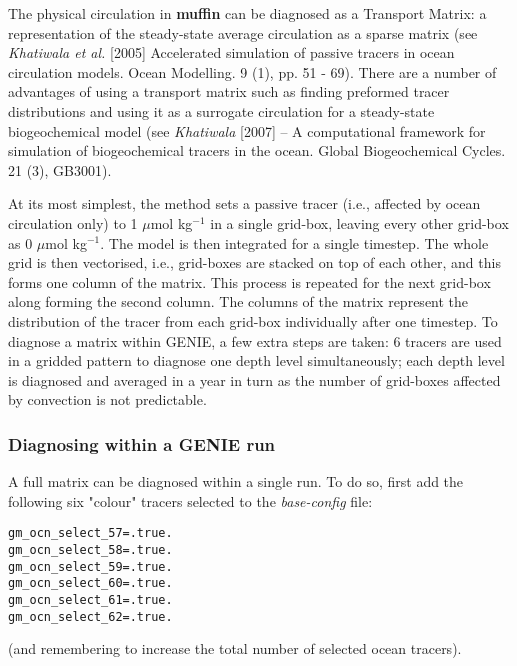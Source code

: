 The physical circulation in \textbf{muffin} can be diagnosed as a Transport Matrix: a representation of the steady-state average circulation as a sparse matrix (see \textit{Khatiwala et al.} [2005] Accelerated simulation of passive tracers in ocean circulation models. Ocean Modelling. 9 (1), pp. 51 - 69). There are a number of advantages of using a transport matrix such as finding preformed tracer distributions and using it as a surrogate circulation for a steady-state biogeochemical model (see \textit{Khatiwala} [2007] -- A computational framework for simulation of biogeochemical tracers in the ocean. Global Biogeochemical Cycles. 21 (3), GB3001).

At its most simplest, the method sets a passive tracer (i.e., affected by ocean circulation only) to 1 $\mu$mol kg$^{-1}$ in a single grid-box, leaving every other grid-box as 0 $\mu$mol kg$^{-1}$. The model is then integrated for a single timestep. The whole grid is then vectorised, i.e., grid-boxes are stacked on top of each other, and this forms one column of the matrix. This process is repeated for the next grid-box along forming the second column. The columns of the matrix represent the distribution of the tracer from each grid-box individually after one timestep. To diagnose a matrix within GENIE, a few extra steps are taken: 6 tracers are used in a gridded pattern to diagnose one depth level simultaneously; each depth level is diagnosed and averaged in a year in turn as the number of grid-boxes affected by convection is not predictable.

%
\subsubsection{Diagnosing within a GENIE run}
\vspace{1mm}

A full matrix can be diagnosed within a single run. To do so, first add the following six "colour" tracers selected to the \textit{base-config} file:
\vspace{-1mm}\small\begin{verbatim}
gm_ocn_select_57=.true.
gm_ocn_select_58=.true.
gm_ocn_select_59=.true.
gm_ocn_select_60=.true.
gm_ocn_select_61=.true.
gm_ocn_select_62=.true.
\end{verbatim}\normalsize\vspace{-1mm}
\noindent (and remembering to increase the total number of selected ocean tracers). 

